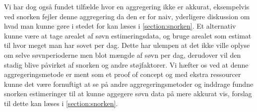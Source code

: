 Vi har dog også fundet tilfælde hvor en aggregering ikke er akkurat, eksempelvis ved snorken fejler denne aggregering da den er for naiv, yderligere diskussion om hvad man kunne gøre i stedet for kan læses i \cref{section:snorken}.
Et alternativ kunne være at tage arealet af søvn estimeringsdata, og bruge arealet som estimat til hvor meget man har sovet per dag.
Dette har ulempen at det ikke ville oplyse om selve søvnperioderne men blot mængde af søvn per dag, derudover vil den stadig blive påvirket af snorken og andre støjfaktorer.
Vi hæfter os ved at denne aggregeringsmetode er ment som et proof of concept og med ekstra ressourcer kunne det være fornuftigt at se på andre aggregeringsmetoder og inddrage fundne snorken estimeringer til at kunne aggegere søvn data på mere akkurat vis, forslag til dette kan læses i \cref{section:snorken}.




